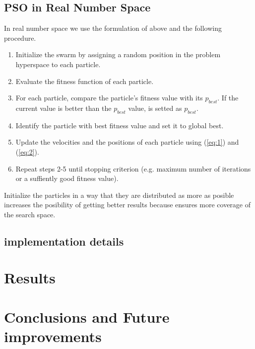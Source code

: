 \documentclass[journal]{IEEEtran}
\begin{document}
\subsection{PSO in Real Number Space}
In real number space we use the formulation of above and the following procedure.
\begin{enumerate}
    \item Initialize the swarm by assigning a random position in the problem hyperspace to each particle.
    \item Evaluate the fitness function of each particle.
    \item For each particle, compare the particle's fitness value with its $p_{best}$. If the current value is better than the $p_{best}$ value, is setted as $p_{best}$.
    \item Identify the particle with best fitness value and set it to global best.
    \item Update the velocities and the positions of each particle using (\ref{eq:1}) and (\ref{eq:2}).
    \item Repeat steps 2-5 until stopping criterion (e.g. maximum number of iterations or a suffiently good fitness value).
\end{enumerate}

Initialize the particles in a way that they are distributed as more as posible increases the posibility of getting better results because ensures more coverage of the search space.
\subsection{implementation details} %

\section{Results}


\section{Conclusions and Future improvements}


\end{document}
